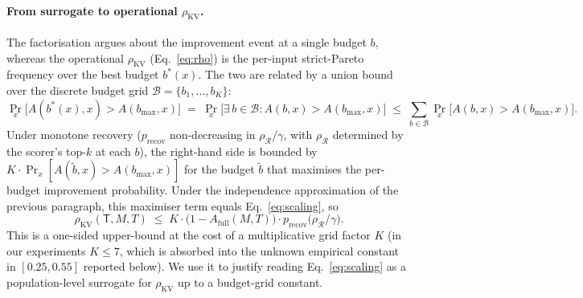 \documentclass{article}
\begin{document}
\paragraph{From surrogate to operational $\rho_{\mathrm{KV}}$.} The
factorisation argues about the improvement event at a single budget $b$,
whereas the operational $\rho_{\mathrm{KV}}$ (Eq.~\eqref{eq:rho}) is the
per-input strict-Pareto frequency over the best budget $b^{*}(x)$. The
two are related by a union bound over the discrete budget grid $\mathcal{B}
= \{b_1, \dots, b_K\}$:
\[
\Pr_x\bigl[A(b^{*}(x), x) > A(b_{\max}, x)\bigr]
\;=\; \Pr_x\bigl[\exists\, b \in \mathcal{B} : A(b, x) > A(b_{\max}, x)\bigr]
\;\le\; \sum_{b \in \mathcal{B}} \Pr_x\bigl[A(b, x) > A(b_{\max}, x)\bigr].
\]
Under monotone recovery ($p_{\mathrm{recov}}$ non-decreasing in
$\rho_{\mathcal{R}}/\gamma$, with $\rho_{\mathcal{R}}$ determined by the
scorer's top-$k$ at each $b$), the right-hand side is bounded by
$K \cdot \Pr_x[A(\widetilde b, x) > A(b_{\max}, x)]$ for the budget
$\widetilde b$ that maximises the per-budget improvement probability.
Under the independence approximation of the previous paragraph, this
maximiser term equals Eq.~\eqref{eq:scaling}, so
\[
\rho_{\mathrm{KV}}(\mathsf{T}, M, T)
\;\le\; K \cdot \bigl(1 - A_{\mathrm{full}}(M, T)\bigr)
\cdot p_{\mathrm{recov}}\bigl(\rho_{\mathcal{R}} / \gamma\bigr).
\]
This is a one-sided upper-bound at the cost of a multiplicative grid
factor $K$ (in our experiments $K \le 7$, which is absorbed into the
unknown empirical constant in $[0.25, 0.55]$ reported below). We use it
to justify reading Eq.~\eqref{eq:scaling} as a population-level surrogate
for $\rho_{\mathrm{KV}}$ up to a budget-grid constant.
\end{document}
